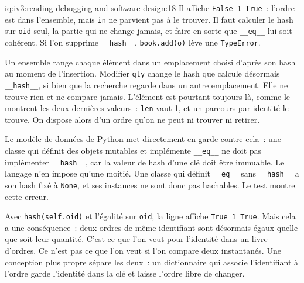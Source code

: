 \begin{solution}{iq:iv3:reading-debugging-and-software-design:18}
Il affiche \texttt{False 1 True}~: l'ordre est dans l'ensemble, mais \texttt{in} ne parvient pas à le trouver. Il faut calculer le hash sur \texttt{oid} seul, la partie qui ne change jamais, et faire en sorte que \texttt{\_\_eq\_\_} lui soit cohérent. Si l'on supprime \texttt{\_\_hash\_\_}, \texttt{book.add(o)} lève une \texttt{TypeError}.

Un ensemble range chaque élément dans un emplacement choisi d'après son hash au moment de l'insertion. Modifier \texttt{qty} change le hash que calcule désormais \texttt{\_\_hash\_\_}, si bien que la recherche regarde dans un autre emplacement. Elle ne trouve rien et ne compare jamais. L'élément est pourtant toujours là, comme le montrent les deux dernières valeurs~: \texttt{len} vaut 1, et un parcours par identité le trouve. On dispose alors d'un ordre qu'on ne peut ni trouver ni retirer.

Le modèle de données de Python met directement en garde contre cela~: une classe qui définit des objets mutables et implémente \texttt{\_\_eq\_\_} ne doit pas implémenter \texttt{\_\_hash\_\_}, car la valeur de hash d'une clé doit être immuable. Le langage n'en impose qu'une moitié. Une classe qui définit \texttt{\_\_eq\_\_} sans \texttt{\_\_hash\_\_} a son hash fixé à \texttt{None}, et ses instances ne sont donc pas hachables. Le test montre cette erreur.

Avec \texttt{hash(self.oid)} et l'égalité sur \texttt{oid}, la ligne affiche \texttt{True 1 True}. Mais cela a une conséquence~: deux ordres de même identifiant sont désormais égaux quelle que soit leur quantité. C'est ce que l'on veut pour l'identité dans un livre d'ordres. Ce n'est pas ce que l'on veut si l'on compare deux instantanés. Une conception plus propre sépare les deux~: un dictionnaire qui associe l'identifiant à l'ordre garde l'identité dans la clé et laisse l'ordre libre de changer.


\end{solution}

